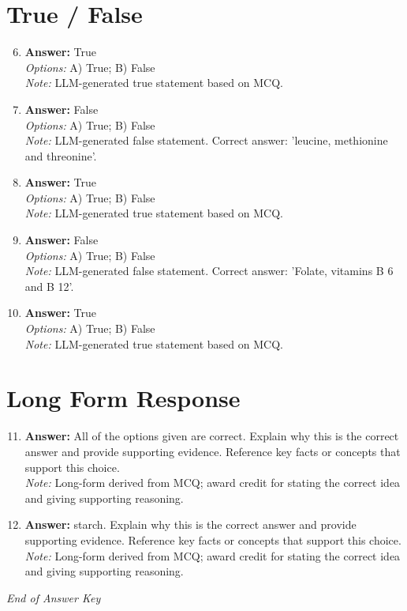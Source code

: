 \documentclass[12pt]{article}
\begin{document}
\section*{True / False}
\begin{enumerate}[label=\arabic*.]
\setcounter{enumi}{5}
\item \textbf{Answer:} True
\\ \textit{Options:} A) True; B) False
\\ \textit{Note:} LLM-generated true statement based on MCQ.
\item \textbf{Answer:} False
\\ \textit{Options:} A) True; B) False
\\ \textit{Note:} LLM-generated false statement. Correct answer: 'leucine, methionine and threonine'.
\item \textbf{Answer:} True
\\ \textit{Options:} A) True; B) False
\\ \textit{Note:} LLM-generated true statement based on MCQ.
\item \textbf{Answer:} False
\\ \textit{Options:} A) True; B) False
\\ \textit{Note:} LLM-generated false statement. Correct answer: 'Folate, vitamins B 6 and B 12'.
\item \textbf{Answer:} True
\\ \textit{Options:} A) True; B) False
\\ \textit{Note:} LLM-generated true statement based on MCQ.
\end{enumerate}

\section*{Long Form Response}
\begin{enumerate}[label=\arabic*.]
\setcounter{enumi}{10}
\item \textbf{Answer:} All of the options given are correct. Explain why this is the correct answer and provide supporting evidence. Reference key facts or concepts that support this choice.
\\ \textit{Note:} Long-form derived from MCQ; award credit for stating the correct idea and giving supporting reasoning.
\item \textbf{Answer:} starch. Explain why this is the correct answer and provide supporting evidence. Reference key facts or concepts that support this choice.
\\ \textit{Note:} Long-form derived from MCQ; award credit for stating the correct idea and giving supporting reasoning.
\end{enumerate}

\vfill
\noindent\textit{End of Answer Key}
\end{document}
